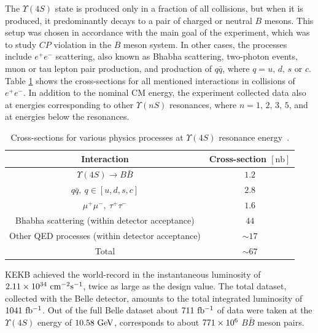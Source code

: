 The $\Upsilon(4S)$ state is produced only in a fraction of all collisions, but when it is produced, it predominantly decays to a pair of charged or neutral $B$ mesons. This setup was chosen in accordance with the main goal of the experiment, which was to study $CP$ violation in the $B$ meson system. In other cases, the processes include $e^+e^-$ scattering, also known as Bhabha scattering, two-photon events, muon or tau lepton pair production, and production of $q \bar q$, where $q=u,\,d,\,s$ or $c$. Table \ref{tab:xsec} shows the cross-sections for all mentioned interactions in collisions of $e^+e^-$.
In addition to the nominal CM energy, the experiment collected data also at energies
corresponding to other $\Upsilon(nS)$ resonances, where $n = 1,\,2,\,3,\,5$, and at energies below the resonances.

\begin{table}[H]
	\centering
	\begin{tabular}{c|c}
		Interaction & Cross-section $[\mathrm{nb}]$ \\ 
		\toprule
		$\Upsilon(4S) \to B \bar B$ & $1.2$ \\
		$q \bar q,~q \in [u,d,s,c]$ & $2.8$ \\
		$\mu^+\mu^-,~\tau^+\tau^-$ & $1.6$ \\
		Bhabha scattering (within detector acceptance)& $44$ \\
		Other QED processes (within detector acceptance)& $\sim 17$ \\
		\midrule
		Total & $\sim 67$ \\
		\bottomrule
	\end{tabular}
	\caption{Cross-sections for various physics processes at $\Upsilon(4S)$ resonance energy~\cite{ABASHIAN2002117}.}
	\label{tab:xsec}
\end{table}

KEKB achieved the world-record in the instantaneous luminosity of $2.11\times 10^{34}\mathrm{~cm^{-2}s^{-1}}$, twice as large as the design value. The total dataset, collected with the Belle detector, amounts to the total integrated luminosity of $1041\mathrm{~fb^{-1}}$. Out of the full Belle dataset about $711\mathrm{~fb^{-1}}$ of data were taken at the $\Upsilon(4S)$ energy of $10.58\mathrm{~GeV}$, corresponds to about $771\times 10^{6}$ $B \bar B$ meson pairs.


